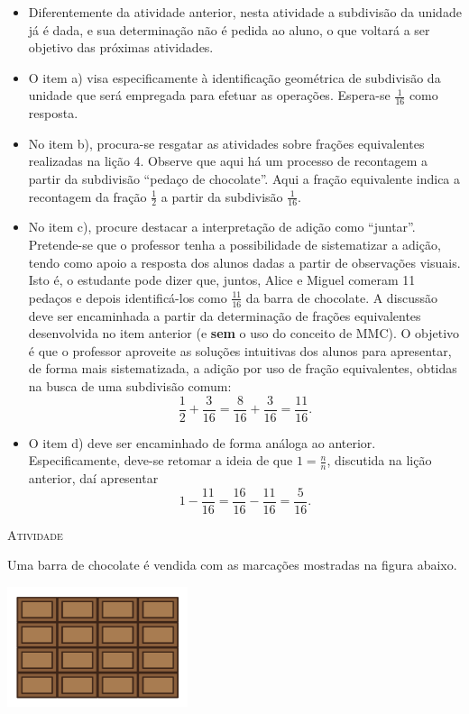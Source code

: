 \documentclass[10 pt,usenames,dvipsnames, oneside]{article}
\begin{document}
\begin{goals}
\begin{itemize}
  \item      Diferentemente da atividade anterior, nesta atividade a subdivisão da unidade já é dada, e sua determinação não é pedida ao aluno, o que voltará a ser objetivo das próximas atividades.
  \item      O item a) visa especificamente à identificação geométrica de subdivisão da unidade que será empregada para efetuar as operações. Espera-se     $\frac{1}{16}$     como resposta.
  \item     No item b), procura-se resgatar as atividades sobre frações equivalentes realizadas na lição 4. Observe que aqui há um processo de recontagem a partir da subdivisão ``pedaço de chocolate''. Aqui a fração equivalente indica a recontagem da fração $\frac{1}{2}$ a partir da subdivisão $\frac{1}{16}$.
  \item  No item c), procure destacar a interpretação de adição como ``juntar''. Pretende-se que o professor tenha a possibilidade de sistematizar a adição, tendo como apoio a resposta dos alunos dadas a partir de observações visuais. Isto é, o estudante pode dizer que, juntos, Alice e Miguel comeram 11 pedaços e depois identificá-los como $\frac{11}{16}$ da barra de chocolate. A discussão deve ser encaminhada a partir da determinação de frações equivalentes desenvolvida no item anterior (e {\bf sem} o uso do conceito de MMC). O objetivo é que o professor aproveite as soluções intuitivas dos alunos para apresentar, de forma mais sistematizada, a adição por uso de fração equivalentes, obtidas na busca de uma subdivisão comum:
$$\frac{1}{2} + \frac{3}{16} = \frac{8}{16} + \frac{3}{16} = \frac{11}{16}.$$
  \item  O item d) deve ser encaminhado de forma análoga ao anterior. Especificamente, deve-se retomar a ideia de que $1 = \frac{n}{n}$, discutida na lição anterior, daí apresentar $$1 - \frac{11}{16} =  \frac{16}{16} - \frac{11}{16} = \frac{5}{16}.$$
\end{itemize}
\end{goals}

\bigskip
\clearpage
\begin{center}
{\large \scshape Atividade}
\end{center}
\fi

Uma barra de chocolate é vendida com as marcações mostradas na figura abaixo.

 \begin{center}
 \includegraphics[width=150pt, keepaspectratio]{ativ3_fig01.png}
 \end{center}
\end{document}
